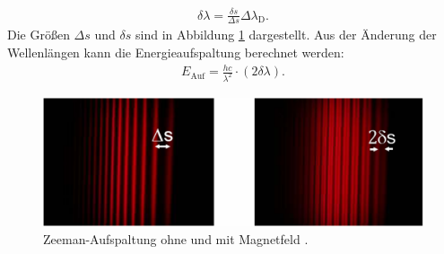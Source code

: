 \begin{gather}
	\delta \lambda = \frac{\delta s}{\Delta s} \Delta\lambda_\text{D}. \label{eq:deltaLambda}
\end{gather}
Die Größen $\Delta s$ und $\delta s$ sind in Abbildung \ref{fig:Auswertung} dargestellt.
Aus der Änderung der Wellenlängen kann die Energieaufspaltung berechnet werden:
\begin{gather}
	E_\text{Auf}=\frac{h c}{\lambda^2} \cdot (2\delta \lambda). \label{eq:EaufExp}
\end{gather}
\begin{figure}
	\centering
	\includegraphics[width=\linewidth-50pt,height=\textheight-50pt,keepaspectratio]{content/Images/Auswertung.png}
    \caption{Zeeman-Aufspaltung ohne und mit Magnetfeld \cite{V27}.}
    \label{fig:Auswertung}
\end{figure}